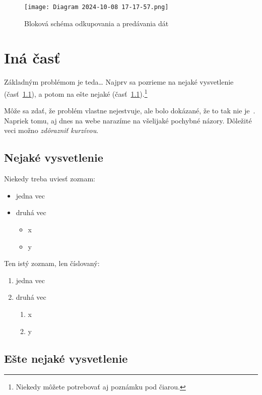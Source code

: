 \documentclass[10pt,twoside,slovak,a4paper]{article}
\begin{document}
\begin{figure*}[tbh]
\centering
\texttt{[image: Diagram 2024-10-08 17-17-57.png]}
\caption{Bloková schéma odkupovania a predávania dát \cite{key1}}
\label{f:rozhod}
\end{figure*}



\section{Iná časť} \label{ina}

Základným problémom je teda\ldots{} Najprv sa pozrieme na nejaké vysvetlenie (časť~\ref{ina:nejake}), a potom na ešte nejaké (časť~\ref{ina:nejake}).\footnote{Niekedy môžete potrebovať aj poznámku pod čiarou.}

Môže sa zdať, že problém vlastne nejestvuje\cite{Coplien:MPD}, ale bolo dokázané, že to tak nie je~\cite{Czarnecki:Staged, Czarnecki:Progress}. Napriek tomu, aj dnes na webe narazíme na všelijaké pochybné názory\cite{PLP-Framework}. Dôležité veci možno \emph{zdôrazniť kurzívou}.


\subsection{Nejaké vysvetlenie} \label{ina:nejake}

Niekedy treba uviesť zoznam:

\begin{itemize}
\item jedna vec
\item druhá vec
	\begin{itemize}
	\item x
	\item y
	\end{itemize}
\end{itemize}

Ten istý zoznam, len číslovaný:

\begin{enumerate}
\item jedna vec
\item druhá vec
	\begin{enumerate}
	\item x
	\item y
	\end{enumerate}
\end{enumerate}


\subsection{Ešte nejaké vysvetlenie} \label{ina:este}
\end{document}

